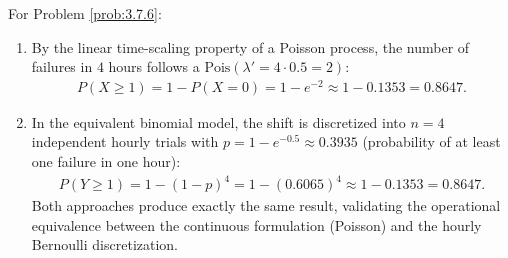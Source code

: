 \begin{solucion}
	\label{sol:3.7.6}
	For Problem \ref{prob:3.7.6}:
	\begin{enumerate}
		\item By the linear time-scaling property of a Poisson process, the number of failures in $4$ hours follows a $\text{Pois}(\lambda' = 4 \cdot 0.5 = 2)$:
		\begin{align*}
			P(X \ge 1) = 1 - P(X = 0) = 1 - e^{-2} \approx 1 - 0.1353 = 0.8647.
		\end{align*}
		\item In the equivalent binomial model, the shift is discretized into $n = 4$ independent hourly trials with $p = 1 - e^{-0.5} \approx 0.3935$ (probability of at least one failure in one hour):
		\begin{align*}
			P(Y \ge 1) = 1 - (1-p)^{4} = 1 - (0.6065)^{4} \approx 1 - 0.1353 = 0.8647.
		\end{align*}
		Both approaches produce exactly the same result, validating the operational equivalence between the continuous formulation (Poisson) and the hourly Bernoulli discretization.
	\end{enumerate}
\end{solucion}

